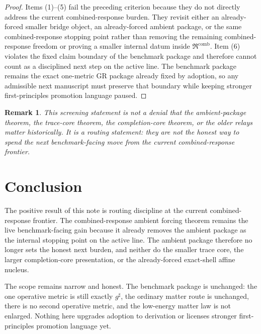\documentclass[11pt]{article}
\newcommand{\CompletedMetric}{g^{\sharp}}
\newcommand{\CombinedLaw}{\mathfrak R^{\mathrm{comb}}}
\newtheorem{remark}{Remark}
\begin{document}
\begin{proof}
Items (1)--(5) fail the preceding criterion because they do not directly address the current combined-response burden. They revisit either an already-forced smaller bridge object, an already-forced ambient package, or the same combined-response stopping point rather than removing the remaining combined-response freedom or proving a smaller internal datum inside \(\CombinedLaw\). Item (6) violates the fixed claim boundary of the benchmark package and therefore cannot count as a disciplined next step on the active line. The benchmark package remains the exact one-metric GR package already fixed by adoption, so any admissible next manuscript must preserve that boundary while keeping stronger first-principles promotion language paused.
\end{proof}

\begin{remark}
This screening statement is not a denial that the ambient-package theorem, the trace-core theorem, the completion-core theorem, or the older relays matter historically. It is a routing statement: they are not the honest way to spend the next benchmark-facing move from the current combined-response frontier.
\end{remark}

\section{Conclusion}

The positive result of this note is routing discipline at the current combined-response frontier. The combined-response ambient forcing theorem remains the live benchmark-facing gain because it already removes the ambient package as the internal stopping point on the active line. The ambient package therefore no longer sets the honest next burden, and neither do the smaller trace core, the larger completion-core presentation, or the already-forced exact-shell affine nucleus.

The scope remains narrow and honest. The benchmark package is unchanged: the one operative metric is still exactly \(\CompletedMetric\), the ordinary matter route is unchanged, there is no second operative metric, and the low-energy matter law is not enlarged. Nothing here upgrades adoption to derivation or licenses stronger first-principles promotion language yet.
\end{document}
